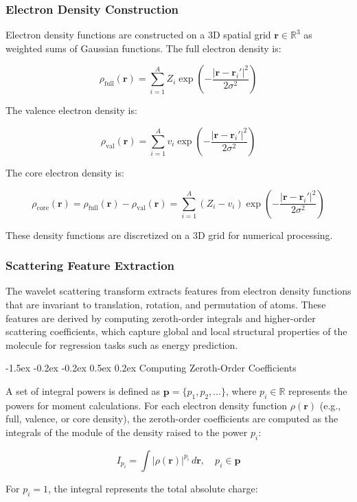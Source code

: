 \documentclass{article}
\makeatletter
\newcounter{subsubsubsection}[subsubsection]
\newcommand\subsubsubsection{\@startsection{subsubsubsection}{4}{\z@}%
    {-1.5ex \@plus -0.2ex \@minus -0.2ex}%
    {0.5ex \@plus 0.2ex}%
    {\normalfont\normalsize\bfseries}}%
\makeatother
\begin{document}
\subsubsection{Electron Density Construction}

Electron density functions are constructed on a 3D spatial grid $\mathbf{r} \in \mathbb{R}^3$ as weighted sums of Gaussian functions. The full electron density is:

\[
\rho_{\text{full}}(\mathbf{r}) = \sum_{i=1}^A Z_i \exp\left(-\frac{|\mathbf{r} - \mathbf{r}_i'|^2}{2\sigma^2}\right)
\]

The valence electron density is:

\[
\rho_{\text{val}}(\mathbf{r}) = \sum_{i=1}^A v_i \exp\left(-\frac{|\mathbf{r} - \mathbf{r}_i'|^2}{2\sigma^2}\right)
\]

The core electron density is:

\[
\rho_{\text{core}}(\mathbf{r}) = \rho_{\text{full}}(\mathbf{r}) - \rho_{\text{val}}(\mathbf{r}) = \sum_{i=1}^A (Z_i - v_i) \exp\left(-\frac{|\mathbf{r} - \mathbf{r}_i'|^2}{2\sigma^2}\right)
\]

These density functions are discretized on a 3D grid for numerical processing.

\subsubsection{Scattering Feature Extraction}

The wavelet scattering transform extracts features from electron density functions that are invariant to translation, rotation, and permutation of atoms. These features are derived by computing zeroth-order integrals and higher-order scattering coefficients, which capture global and local structural properties of the molecule for regression tasks such as energy prediction.

\subsubsubsection{Computing Zeroth-Order Coefficients}

A set of integral powers is defined as $\mathbf{p} = \{p_1, p_2, \ldots\}$, where $p_i \in \mathbb{R}$ represents the powers for moment calculations. For each electron density function $\rho(\mathbf{r})$ (e.g., full, valence, or core density), the zeroth-order coefficients are computed as the integrals of the module of the density raised to the power $p_i$:

\[
I_{p_i} = \int |\rho(\mathbf{r})|^{p_i} \, d\mathbf{r}, \quad p_i \in \mathbf{p}
\]

For $p_i = 1$, the integral represents the total absolute charge:
\end{document}
